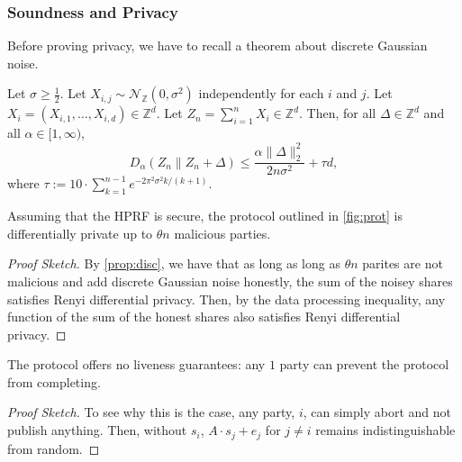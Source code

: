 \subsubsection*{Soundness and Privacy}

Before proving privacy, we have to recall a theorem about discrete Gaussian noise.


\begin{proposition}
	\label{prop:disc}
	Let $\sigma \geq \frac{1}{2}$.
	Let $X_{i,j} \sim \mathcal{N}_\mathbb{Z}(0, \sigma^2)$ independently for each $i$ and $j$.
	Let $X_i = (X_{i,1}, \dots, X_{i,d}) \in \mathbb{Z}^d$.
	Let $Z_n = \sum_{i=1}^n X_i \in \mathbb{Z}^d$. Then, for all $\Delta \in \mathbb{Z}^d$ and all $\alpha \in [1, \infty)$,
	\[
		D_\alpha(Z_n \parallel Z_n + \Delta) \leq \frac{\alpha \|\Delta\|_2^2}{2n\sigma^2} + \tau d,
	\]
	where $\tau := 10 \cdot \sum_{k=1}^{n-1} e^{-2\pi^2\sigma^2k/(k+1)}$.
\end{proposition}


\begin{theorem}
	Assuming that the HPRF is secure, the protocol outlined in \cref{fig:prot} is differentially private up to $\theta n$ malicious parties.
\end{theorem}
\begin{proof}[Proof Sketch]
	By \cref{prop:disc}, we have that as long as long as $\theta n$ parites are not malicious and add discrete Gaussian noise honestly, the sum of the noisey shares satisfies Renyi differential privacy.
	Then, by the data processing inequality, any function of the sum of the honest shares also satisfies Renyi differential privacy.
\end{proof}

\begin{theorem}[Liveness]
	The protocol offers no liveness guarantees: any $1$ party can prevent the protocol from completing.
\end{theorem}
\begin{proof}[Proof Sketch]
	To see why this is the case, any party, $i$, can simply abort and not publish anything.
	Then, without $s_i$, $A \cdot s_j + e_j$ for $j \neq i$ remains indistinguishable from random.
\end{proof}


